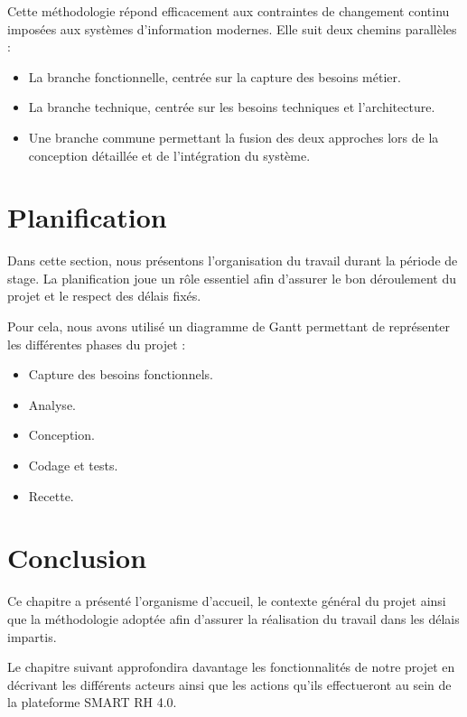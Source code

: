 Cette méthodologie répond efficacement aux contraintes de changement continu imposées aux systèmes d'information modernes. Elle suit deux chemins parallèles :

\begin{itemize}
    \item La branche fonctionnelle, centrée sur la capture des besoins métier.
    \item La branche technique, centrée sur les besoins techniques et l'architecture.
    \item Une branche commune permettant la fusion des deux approches lors de la conception détaillée et de l'intégration du système.
\end{itemize}

\section{Planification}

Dans cette section, nous présentons l'organisation du travail durant la période de stage. La planification joue un rôle essentiel afin d'assurer le bon déroulement du projet et le respect des délais fixés.

Pour cela, nous avons utilisé un diagramme de Gantt permettant de représenter les différentes phases du projet :

\begin{itemize}
    \item Capture des besoins fonctionnels.
    \item Analyse.
    \item Conception.
    \item Codage et tests.
    \item Recette.
\end{itemize}

\section*{Conclusion}

Ce chapitre a présenté l'organisme d'accueil, le contexte général du projet ainsi que la méthodologie adoptée afin d'assurer la réalisation du travail dans les délais impartis.

Le chapitre suivant approfondira davantage les fonctionnalités de notre projet en décrivant les différents acteurs ainsi que les actions qu'ils effectueront au sein de la plateforme SMART RH 4.0.
